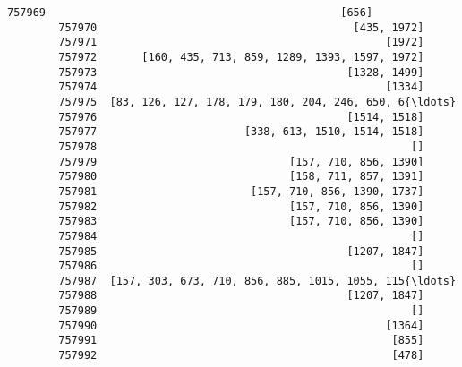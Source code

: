 \documentclass[11pt]{article}
\begin{document}
\begin{Verbatim}[commandchars=\\\{\}]
        757969                                              [656]   
        757970                                        [435, 1972]   
        757971                                             [1972]   
        757972       [160, 435, 713, 859, 1289, 1393, 1597, 1972]   
        757973                                       [1328, 1499]   
        757974                                             [1334]   
        757975  [83, 126, 127, 178, 179, 180, 204, 246, 650, 6{\ldots}   
        757976                                       [1514, 1518]   
        757977                       [338, 613, 1510, 1514, 1518]   
        757978                                                 []   
        757979                              [157, 710, 856, 1390]   
        757980                              [158, 711, 857, 1391]   
        757981                        [157, 710, 856, 1390, 1737]   
        757982                              [157, 710, 856, 1390]   
        757983                              [157, 710, 856, 1390]   
        757984                                                 []   
        757985                                       [1207, 1847]   
        757986                                                 []   
        757987  [157, 303, 673, 710, 856, 885, 1015, 1055, 115{\ldots}   
        757988                                       [1207, 1847]   
        757989                                                 []   
        757990                                             [1364]   
        757991                                              [855]   
        757992                                              [478]   
        

\end{Verbatim}
\end{document}

